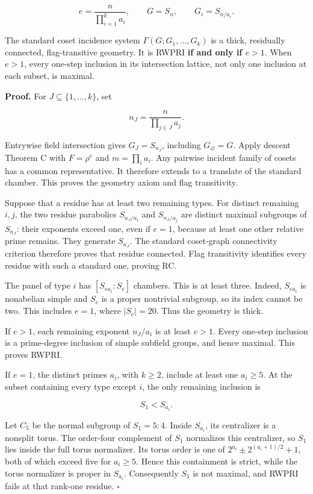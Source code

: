 \documentclass[11pt,a4paper]{article}
\begin{document}
\[
 e=\frac{n}{\prod_{i=1}^k a_i},\qquad
 G=S_n,\qquad G_i=S_{n/a_i}.
\]

The standard coset incidence system \(\Gamma(G;G_1,\ldots,G_k)\) is a
thick, residually connected, flag-transitive geometry. It is RWPRI
\textbf{if and only if \(e>1\)}. When \(e>1\), every one-step inclusion
in its intersection lattice, not only one inclusion at each subset, is
maximal.

\textbf{Proof.} For \(J\subseteq\{1,\ldots,k\}\), set

\[
 n_J=\frac{n}{\prod_{j\in J}a_j}.
\]

Entrywise field intersection gives \(G_J=S_{n_J}\), including
\(G_\varnothing=G\). Apply descent Theorem C with \(F=\rho^e\) and
\(m=\prod_i a_i\). Any pairwise incident family of cosets has a common
representative. It therefore extends to a translate of the standard
chamber. This proves the geometry axiom and flag transitivity.

Suppose that a residue has at least two remaining types. For distinct
remaining \(i,j\), the two residue parabolics \(S_{n_J/a_i}\) and
\(S_{n_J/a_j}\) are distinct maximal subgroups of \(S_{n_J}\): their
exponents exceed one, even if \(e=1\), because at least one other
relative prime remains. They generate \(S_{n_J}\). The standard
coset-graph connectivity criterion therefore proves that residue
connected. Flag transitivity identifies every residue with such a
standard one, proving RC.

The panel of type \(i\) has \([S_{ea_i}:S_e]\) chambers. This is at
least three. Indeed, \(S_{ea_i}\) is nonabelian simple and \(S_e\) is a
proper nontrivial subgroup, so its index cannot be two. This includes
\(e=1\), where \(|S_e|=20\). Thus the geometry is thick.

If \(e>1\), each remaining exponent \(n_J/a_i\) is at least \(e>1\).
Every one-step inclusion is a prime-degree inclusion of simple subfield
groups, and hence maximal. This proves RWPRI.

If \(e=1\), the distinct primes \(a_i\), with \(k\ge2\), include at
least one \(a_i\ge5\). At the subset containing every type except \(i\),
the only remaining inclusion is

\[
 S_1<S_{a_i}.
\]

Let \(C_5\) be the normal subgroup of \(S_1=5:4\). Inside \(S_{a_i}\),
its centralizer is a nonsplit torus. The order-four complement of
\(S_1\) normalizes this centralizer, so \(S_1\) lies inside the full
torus normalizer. Its torus order is one of
\(2^{a_i}\pm2^{(a_i+1)/2}+1\), both of which exceed five for
\(a_i\ge5\). Hence this containment is strict, while the torus
normalizer is proper in \(S_{a_i}\). Consequently \(S_1\) is not
maximal, and RWPRI fails at that rank-one residue. \(\square\)
\end{document}
